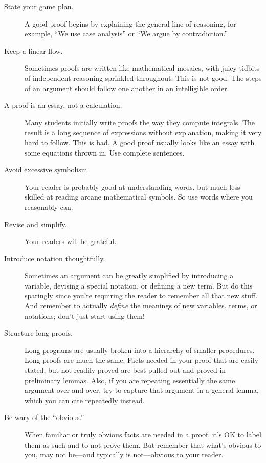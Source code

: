 \begin{description}

\item[State your game plan.]  A good proof begins by explaining the
  general line of reasoning, for example, ``We use case analysis'' or ``We
  argue by contradiction.''

\item[Keep a linear flow.]  Sometimes proofs are written like mathematical
  mosaics, with juicy tidbits of independent reasoning sprinkled
  throughout.  This is not good.  The steps of an argument should follow
  one another in an intelligible order.

\item[A proof is an essay, not a calculation.]  Many students initially
  write proofs the way they compute integrals.  The result is a long
  sequence of expressions without explanation, making it very hard to
  follow.  This is bad.  A good proof usually looks like an essay with
  some equations thrown in.  Use complete sentences.

\item[Avoid excessive symbolism.]  Your reader is probably good at
understanding words, but much less skilled at reading arcane
mathematical symbols.  So use words where you reasonably can.

\item[Revise and simplify.]  Your readers will be grateful.

\item[Introduce notation thoughtfully.]  Sometimes an argument can be
greatly simplified by introducing a variable, devising a special
notation, or defining a new term.  But do this sparingly since you're
requiring the reader to remember all that new stuff.  And remember to
actually \textit{define} the meanings of new variables, terms, or
notations; don't just start using them!

\item[Structure long proofs.]  Long programs are usually broken into a
hierarchy of smaller procedures.  Long proofs are much the same.
Facts needed in your proof that are easily stated, but not readily
proved are best pulled out and proved in preliminary lemmas.  Also, if
you are repeating essentially the same argument over and over, try to
capture that argument in a general lemma, which you can cite
repeatedly instead.

\item[Be wary of the ``obvious.'']  When familiar or truly obvious facts
  are needed in a proof, it's OK to label them as such and to not prove
  them.  But remember that what's obvious to you, may not be---and
  typically is not---obvious to your reader.


\end{description}
